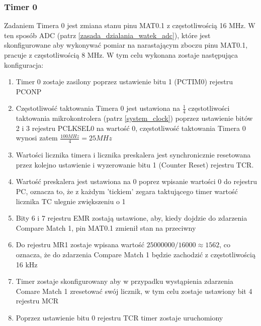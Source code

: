 \subsubsection{Timer 0}
Zadaniem Timera 0 jest zmiana stanu pinu MAT0.1 z częstotliwością 16 MHz. W ten sposób ADC (patrz \ref{zasada_dzialania_watek_adc}), które jest skonfigurowane aby wykonywać pomiar na narastającym zboczu pinu MAT0.1, pracuje z częstotliwością 8 MHz. W tym celu wykonana zostaje następująca konfiguracja:
\begin{enumerate}
    \item Timer 0 zostaje zasilony poprzez ustawienie bitu 1 (PCTIM0) rejestru PCONP
    \item Częstotliwość taktowania Timera 0 jest ustawiona na $\frac{1}{4}$ częstotliwości taktowania mikrokontrolera (patrz \ref{system_clock}) poprzez ustawienie bitów 2 i 3 rejestru PCLKSEL0 na wartość 0, częstotliwość taktowania Timera 0 wynosi zatem $\frac{100MHz}{4} = 25MHz$
    \item Wartości licznika timera i licznika preskalera jest synchronicznie resetowana przez kolejno ustawienie i wyzerowanie bitu 1 (Counter Reset) rejestru TCR.
    \item Wartość preskalera jest ustawiona na 0 poprez wpisanie wartości 0 do rejestru PC, oznacza to, że z każdym 'tickiem' zegara taktującego timer wartość licznika TC ulegnie zwiększeniu o 1
    \item Bity 6 i 7 rejestru EMR zostają ustawione, aby, kiedy dojdzie do zdarzenia Compare Match 1, pin MAT0.1 zmienił stan na przeciwny
    \item Do rejestru MR1 zostaje wpisana wartość $25000000 / 16000 \approx 1562$, co oznacza, że do zdarzenia Compare Match 1 będzie zachodzić z częstotliwością 16 kHz
    \item Timer zostaje skonfigurowany aby w przypadku wystąpienia zdarzenia Comare Match 1 zresetować swój licznik, w tym celu zostaje ustawiony bit 4 rejestru MCR
    \item Poprzez ustawienie bitu 0 rejestru TCR timer zostaje uruchomiony
\end{enumerate}

